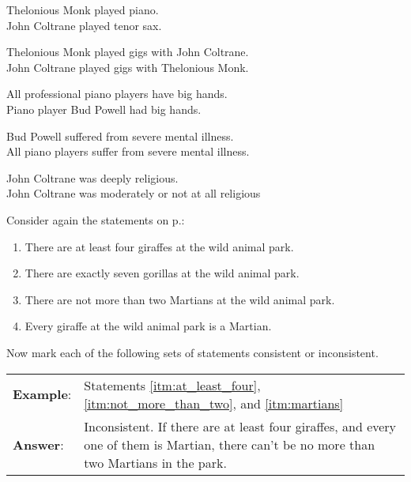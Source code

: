 \begin{exercises}
\item  Thelonious Monk played piano.	\\
John Coltrane played tenor sax. 

\item  Thelonious Monk played gigs with John Coltrane.	\\
	John Coltrane played gigs with Thelonious Monk.

\item  All professional piano players have big hands.	\\
	Piano player Bud Powell had big hands.

\item  Bud Powell suffered from severe mental illness.	 \\
	All piano players suffer from severe mental illness.

\item John Coltrane was deeply religious.	 \\
John Coltrane was moderately or not at all religious 
\end{exercises}


\noindent \problempart Consider again the statements on p.\pageref{MartianGiraffes}: 
\begin{enumerate}[label=(\alph*)]
\item \label{itm:at_least_four}There are at least four giraffes at the wild animal park.
\item \label{itm:exactly_seven} There are exactly seven gorillas at the wild animal park.
\item \label{itm:not_more_than_two} There are not more than two Martians at the wild animal park.
\item \label{itm:martians} Every giraffe at the wild animal park is a Martian.
\end{enumerate}
Now mark each of the following sets of statements consistent or inconsistent.
\begin{longtabu}{p{.1\linewidth}p{.9\linewidth}}
\textbf{Example}: & Statements \ref{itm:at_least_four}, \ref{itm:not_more_than_two}, and \ref{itm:martians}\\
\textbf{Answer}: & Inconsistent. If there are at least four giraffes, and every one of them is Martian, there can't be no more than two Martians in the park.\\
\end{longtabu}




